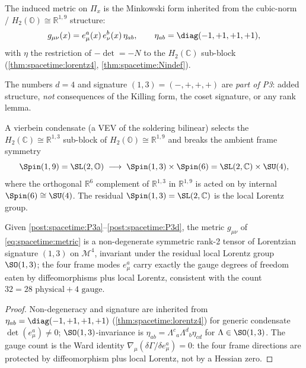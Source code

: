 \begin{postulate}\label{post:spacetime:P3b}
The induced metric on $\Pi_x$ is the Minkowski form inherited from the cubic-norm /
$H_2(\mathbb O)\cong\mathbb R^{1,9}$ structure:
\begin{equation}\label{eq:spacetime:metric}
  g_{\mu\nu}(x)=e^a_\mu(x)\,e^b_\nu(x)\,\eta_{ab},\qquad
  \eta_{ab}=\diag(-1,+1,+1,+1),
\end{equation}
with $\eta$ the restriction of $-\det=-N$ to the $H_2(\mathbb C)$ sub-block
(\autoref{thm:spacetime:lorentz4}, \autoref{thm:spacetime:Nindef}).
\end{postulate}

\begin{postulate}\label{post:spacetime:P3c}
The numbers $d=4$ and signature $(1,3)=(-,+,+,+)$ are \emph{part of P3}: added
structure, \emph{not} consequences of the Killing form, the coset signature, or any
rank lemma.
\end{postulate}

\begin{postulate}\label{post:spacetime:P3d}
A vierbein condensate (a VEV of the soldering bilinear) selects the
$H_2(\mathbb C)\cong\mathbb R^{1,3}$ sub-block of $H_2(\mathbb O)\cong\mathbb R^{1,9}$ and
breaks the ambient frame symmetry
\begin{equation}\label{eq:spacetime:framebreak}
  \Spin(1,9)=\SL(2,\mathbb O)\;\longrightarrow\;\Spin(1,3)\times\Spin(6)
  =\SL(2,\mathbb C)\times\SU(4),
\end{equation}
where the orthogonal $\mathbb R^6$ complement of $\mathbb R^{1,3}$ in $\mathbb R^{1,9}$
is acted on by internal $\Spin(6)\cong\SU(4)$. The residual $\Spin(1,3)=\SL(2,\mathbb C)$
is the local Lorentz group.
\end{postulate}

\begin{theorem}\label{thm:spacetime:P3consistent}
Given \autoref{post:spacetime:P3a}--\autoref{post:spacetime:P3d}, the metric
$g_{\mu\nu}$ of \eqref{eq:spacetime:metric} is a non-degenerate symmetric rank-2 tensor
of Lorentzian signature $(1,3)$ on $\mathcal M^4$, invariant under the residual local
Lorentz group $\SO(1,3)$; the four frame modes $e^a_\mu$ carry exactly the gauge
degrees of freedom eaten by diffeomorphisms plus local Lorentz, consistent with the
count $32=28\text{ physical}+4\text{ gauge}$.
\end{theorem}
\begin{proof}
Non-degeneracy and signature are inherited from $\eta_{ab}=\diag(-1,+1,+1,+1)$
(\autoref{thm:spacetime:lorentz4}) for generic condensate $\det(e^a_\mu)\ne0$;
$\SO(1,3)$-invariance is $\eta_{ab}=\Lambda^c{}_a\Lambda^d{}_b\eta_{cd}$ for
$\Lambda\in\SO(1,3)$. The gauge count is the Ward identity
$\nabla_\mu(\delta\Gamma/\delta e^a_\mu)=0$: the four frame directions are protected by
diffeomorphism plus local Lorentz, not by a Hessian zero.
\end{proof}

